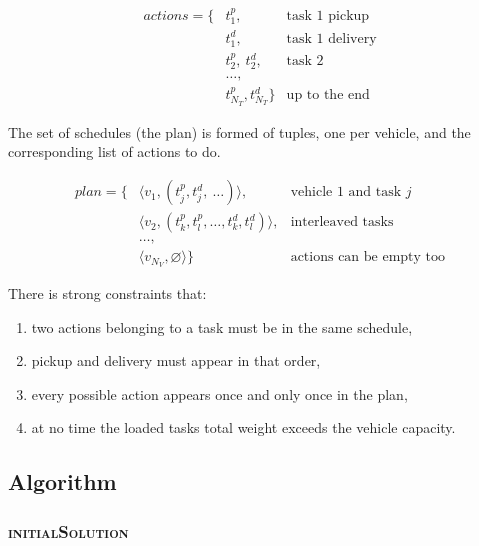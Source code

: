 \documentclass[11pt,a4paper]{article}
\begin{document}
\begin{align*}
actions = \{&t_1^p,                               & \text{task $1$ pickup} \\
            &t_1^d,                               & \text{task $1$ delivery} \\
            &t_2^p, \: t_2^d,                     & \text{task 2} \\
            &\dots,                               & \\
            &t_{N_T}^p, t_{N_T}^d\}               & \text{up to the end}
\end{align*}

The set of schedules (the plan) is formed of tuples, one per vehicle, and the
corresponding list of actions to do.

\begin{align*}
plan = \{&\langle v_1, (t_j^p, t_j^d, \: \dots) \rangle,            & \text{vehicle $1$ and task $j$} \\
         &\langle v_2, (t_k^p, t_l^p, \dots, t_k^d, t_l^d) \rangle, & \text{interleaved tasks} \\
         &\dots,                                                        & \\
         &\langle v_{N_V}, \varnothing \rangle\}                    & \text{actions can be empty too}
\end{align*}

There is strong constraints that:

\begin{enumerate}
    \item two actions belonging to a task must be in the same schedule,

    \item pickup and delivery must appear in that order,

    \item every possible action appears once and only once in the plan,

    \item at no time the loaded tasks total weight exceeds the vehicle capacity.
\end{enumerate}


\subsection*{Algorithm}
\subsubsection*{\textsc{initialSolution}}
\end{document}
